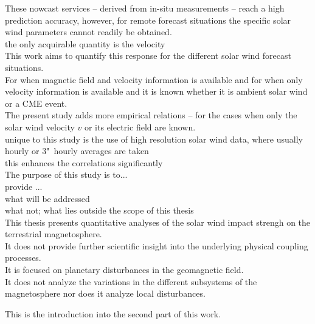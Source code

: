 These nowcast services -- derived from in-situ measurements -- reach a high prediction accuracy, however, for remote forecast situations the specific solar wind parameters cannot readily be obtained.\\


the only acquirable quantity is the velocity\\



This work aims to quantify this response for the different solar wind forecast situations.\\
For when magnetic field and velocity information is available and for when only velocity information is available and it is known whether it is ambient solar wind or a CME event.\\
The present study adds more empirical \Kp{} relations -- for the cases when only the solar wind velocity $v$ or its electric field \vBz{} are known.\\

unique to this study is the use of high resolution solar wind data, where usually hourly or 3"~hourly averages are taken\\
this enhances the correlations significantly\\


The purpose of this study is to...\\
provide ...\\


what will be addressed\\
what not; what lies outside the scope of this thesis\\
This thesis presents quantitative analyses of the solar wind impact strengh on the terrestrial magnetosphere.\\
It does not provide further scientific insight into the underlying physical coupling processes.\\
It is focused on planetary disturbances in the geomagnetic field.\\
It does not analyze the variations in the different subsystems of the magnetosphere nor does it analyze local disturbances.\\



\bigskip


This is the introduction into the second part of this work.\\

